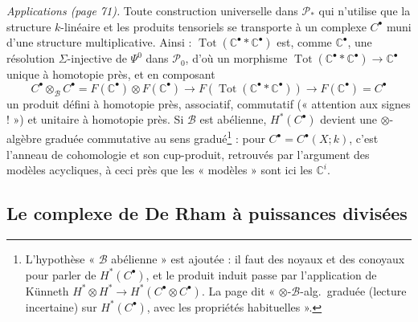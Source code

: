 \documentclass[11pt,a4paper]{article}
\begin{document}
\emph{Applications (page 71).} Toute construction universelle dans
$\mathcal{P}_{*}$ qui n'utilise que la structure $k$-linéaire et les
produits tensoriels se transporte à un complexe $C^{\bullet}$ muni d'une
structure multiplicative. Ainsi : $\operatorname{Tot}(\mathbb{C}^{\bullet} *
\mathbb{C}^{\bullet})$ est, comme $\mathbb{C}^{\bullet}$, une résolution
$\Sigma$-injective de $\Psi^{0}$ dans $\mathcal{P}_{0}$, d'où un morphisme
$\operatorname{Tot}(\mathbb{C}^{\bullet} * \mathbb{C}^{\bullet}) \to
\mathbb{C}^{\bullet}$ unique à homotopie près, et en composant
\[
  C^{\bullet} \otimes_{\mathcal{B}} C^{\bullet} = F(\mathbb{C}^{\bullet})
  \otimes F(\mathbb{C}^{\bullet}) \to F(\operatorname{Tot}(\mathbb{C}^{\bullet}
  * \mathbb{C}^{\bullet})) \to F(\mathbb{C}^{\bullet}) = C^{\bullet}
\]
un produit défini à homotopie près, associatif, commutatif (« attention aux
signes ! ») et unitaire à homotopie près. Si $\mathcal{B}$ est abélienne,
$H^{*}(C^{\bullet})$ devient une $\otimes$-algèbre graduée commutative au
sens gradué\footnote{L'hypothèse « $\mathcal{B}$ abélienne » est ajoutée :
il faut des noyaux et des conoyaux pour parler de $H^{*}(C^{\bullet})$, et le
produit induit passe par l'application de Künneth $H^{*} \otimes H^{*} \to
H^{*}(C^{\bullet} \otimes C^{\bullet})$. La page dit « $\otimes$-$\mathcal{B}$-alg.\ graduée (lecture incertaine) sur $H^{*}(C^{\bullet})$, avec les propriétés
habituelles ».} : pour $C^{\bullet} = C^{\bullet}(X; k)$, c'est l'anneau de
cohomologie et son cup-produit, retrouvés par l'argument des modèles
acycliques, à ceci près que les « modèles » sont ici les
$\mathbb{C}^{i}$.

\subsection*{Le complexe de De Rham à puissances divisées}
\end{document}
